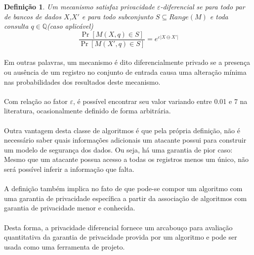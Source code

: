 \newtheorem{definition}{Definição}
\begin{definition}\cite{dwork2011differential}
     Um mecanismo satisfaz privacidade $\varepsilon$-diferencial se para todo par de bancos de dados $X$,$X'$ e para todo subconjunto $S \subseteq Range(M)$ e toda consulta $q \in \mathbb{Q}$(caso aplicável)
     \[ \frac{\Pr \left[M\left(X,q\right)  \in  S \right]}{\Pr \left[M\left(X',q\right)  \in  S \right]} = e^{\varepsilon\vert X \ominus X' \vert }\]
\end{definition}

\paragraph{} Em outras palavras, um mecanismo é dito diferencialmente privado se a presença ou ausência de um registro no conjunto de entrada causa uma alteração mínima nas probabilidades dos resultados deste mecanismo.

\paragraph{} Com relação ao fator $\varepsilon$, é possível encontrar seu valor variando entre 0.01 e 7 na literatura, ocasionalmente definido de forma arbitrária\cite{hsu2014differential}.

\paragraph{} Outra vantagem desta classe de algoritmos é que pela própria definição, não é necessário saber quais informações adicionais um atacante possui para construir um modelo de segurança dos dados. Ou seja, há uma garantia de pior caso: Mesmo que um atacante possua acesso a todas os registros menos um único, não será possível inferir a informação que falta.

\paragraph{} A definição também implica no fato de que pode-se compor um algoritmo com uma garantia de privacidade específica a partir da associação de algoritmos com garantia de privacidade menor e conhecida\cite{cummings2018differential}.

\paragraph{} Desta forma, a privacidade diferencial fornece um arcabouço para avaliação quantitativa da garantia de privacidade provida por um algoritmo e pode ser usada como uma ferramenta de projeto\cite{mcsherry2007mechanism}.


